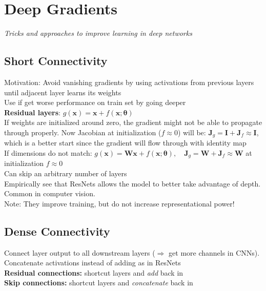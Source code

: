 \section*{Deep Gradients}
\textit{Tricks and approaches to improve learning in deep networks}
\subsection*{Short Connectivity}
Motivation: Avoid vanishing gradients by using activations from previous layers until adjacent layer learns its weights\\
Use if get worse performance on train set by going deeper\\
\textbf{Residual layers}: $g(\mathbf x)=\mathbf x+f(\mathbf x;\pmb\theta)$\\
If weights are initialized around zero, the gradient might not be able to propagate through properly. Now Jacobian at initialization ($f\approx 0$) will be: $\mathbf J_g=\mathbf I+\mathbf J_f\approx \mathbf I$, which is a better start since the gradient will flow through with identity map\\
If dimensions do not match: $g(\mathbf x)=\mathbf{Wx}+f(\mathbf x;\pmb\theta), \quad \mathbf J_g=\mathbf W+\mathbf J_f\approx \mathbf W$ at initialization $f\approx 0$\\
Can skip an arbitrary number of layers\\
Empirically see that ResNets allows the model to better take advantage of depth. Common in computer vision.\\
Note: They improve training, but do not increase representational power!
\subsection*{Dense Connectivity}
Connect layer output to all downstream layers ($\Rightarrow$ get more channels in CNNs). Concatenate activations instead of adding as in ResNets\\
\textbf{Residual connections:} shortcut layers and \textit{add} back in\\
\textbf{Skip connections:} shortcut layers and \textit{concatenate} back in
